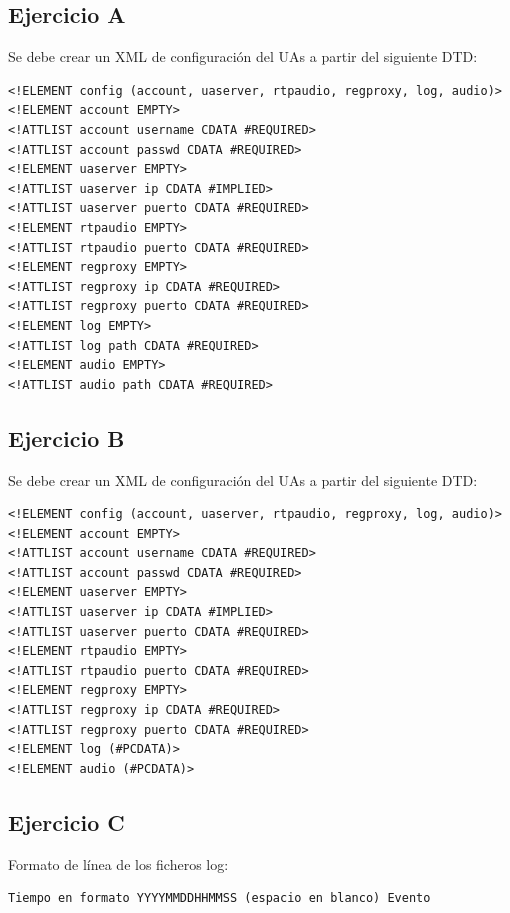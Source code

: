 \documentclass[a4paper,11pt]{article}
\begin{document}
\subsection{Ejercicio A}

Se debe crear un XML de configuración del UAs a partir del siguiente DTD:

\begin{verbatim}
<!ELEMENT config (account, uaserver, rtpaudio, regproxy, log, audio)>
<!ELEMENT account EMPTY>
<!ATTLIST account username CDATA #REQUIRED>
<!ATTLIST account passwd CDATA #REQUIRED>
<!ELEMENT uaserver EMPTY>
<!ATTLIST uaserver ip CDATA #IMPLIED>
<!ATTLIST uaserver puerto CDATA #REQUIRED>
<!ELEMENT rtpaudio EMPTY>
<!ATTLIST rtpaudio puerto CDATA #REQUIRED>
<!ELEMENT regproxy EMPTY>
<!ATTLIST regproxy ip CDATA #REQUIRED>
<!ATTLIST regproxy puerto CDATA #REQUIRED>
<!ELEMENT log EMPTY>
<!ATTLIST log path CDATA #REQUIRED>
<!ELEMENT audio EMPTY>
<!ATTLIST audio path CDATA #REQUIRED>
\end{verbatim}


\subsection{Ejercicio B}

Se debe crear un XML de configuración del UAs a partir del siguiente DTD:

\begin{verbatim}
<!ELEMENT config (account, uaserver, rtpaudio, regproxy, log, audio)>
<!ELEMENT account EMPTY>
<!ATTLIST account username CDATA #REQUIRED>
<!ATTLIST account passwd CDATA #REQUIRED>
<!ELEMENT uaserver EMPTY>
<!ATTLIST uaserver ip CDATA #IMPLIED>
<!ATTLIST uaserver puerto CDATA #REQUIRED>
<!ELEMENT rtpaudio EMPTY>
<!ATTLIST rtpaudio puerto CDATA #REQUIRED>
<!ELEMENT regproxy EMPTY>
<!ATTLIST regproxy ip CDATA #REQUIRED>
<!ATTLIST regproxy puerto CDATA #REQUIRED>
<!ELEMENT log (#PCDATA)>
<!ELEMENT audio (#PCDATA)>
\end{verbatim}


\subsection{Ejercicio C}

Formato de línea de los ficheros log:

\begin{footnotesize}
\begin{verbatim}
Tiempo en formato YYYYMMDDHHMMSS (espacio en blanco) Evento
\end{verbatim}
\end{footnotesize}
\end{document}
